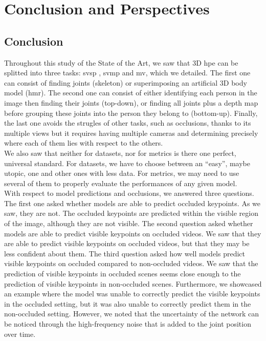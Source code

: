 \documentclass[runningheads]{llncs}
\begin{document}
\section{Conclusion and Perspectives}
\subsection{Conclusion}
Throughout this study of the State of the Art, we saw that 3D \ac{hpe} can be splitted into three tasks: \ac{svsp} , \ac{svmp} and \ac{mv}, which we detailed. The first one can consist of finding joints (skeleton) or superimposing an artificial 3D body model (\ac{hmr}). The second one can consist of either identifying each person in the image then finding their joints (top-down), or finding all joints plus a depth map before grouping these joints into the person they belong to (bottom-up). Finally, the last one avoids the strugles of other tasks, such as occlusions, thanks to its multiple views but it requires having multiple cameras and determining precisely where each of them lies with respect to the others. \\
We also saw that neither for datasets, nor for metrics is there one perfect, universal standard. For datasets, we have to choose between an ``easy'', maybe utopic, one and other ones with less data. For metrics, we may need to use several of them to properly evaluate the performances of any given model. \\
With respect to model predictions and occlusions, we answered three questions. The first one asked whether models are able to predict occluded keypoints. As we saw, they are not. The occluded keypoints are predicted within the visible region of the image, although they are not visible.
The second question asked whether models are able to predict visible keypoints on occluded videos. We saw that they are able to predict visible keypoints on occluded videos, but that they may be less confident about them.
The third question asked how well models predict visible keypoints on occluded compared to non-occluded videos. We saw that the prediction of visible keypoints in occluded scenes seems close enough to the prediction of visible keypoints in non-occluded scenes. Furthermore, we showcased an example where the model was unable to correctly predict the visible keypoints in the occluded setting, but it was also unable to correctly predict them in the non-occluded setting. However, we noted that the uncertainty of the network can be noticed through the high-frequency noise that is added to the joint position over time.
\end{document}
